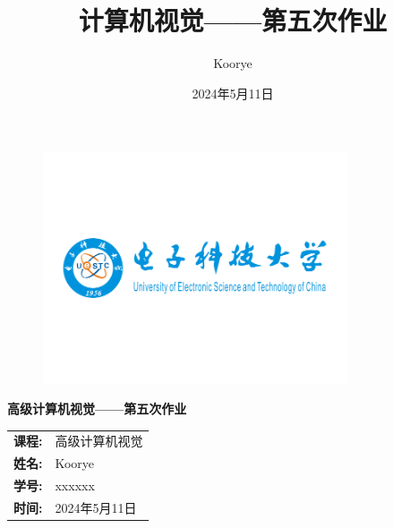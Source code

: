 \documentclass{article}
\title{计算机视觉——第五次作业}
\author{Koorye}
\date{2024年5月11日}
\begin{document}

\thispagestyle{empty}

\begin{figure}[t]
    \centering
    \includegraphics[width=0.8\textwidth]{pics/logo.png}
\end{figure}

\vspace*{\fill}
    \begin{center}
        \huge\textbf{高级计算机视觉——第五次作业}
    \end{center}
\vspace*{\fill}

\begin{table}[b]
    \centering
    \large
    \begin{tabular}{ll}
    \textbf{课程:} & 高级计算机视觉 \\
    \textbf{姓名:} & Koorye \\
    \textbf{学号:} & xxxxxx \\
    \textbf{时间:} & 2024年5月11日 \\
    \end{tabular}
\end{table}

\newpage
\tableofcontents

\newpage










\newpage

\end{document}
